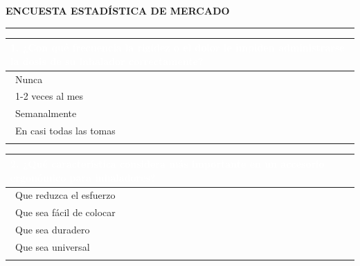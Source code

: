 \documentclass[11pt,a4paper]{article}
\begin{document}
\newcommand{\casilla}{\raisebox{-0.5ex}{\fbox{\rule{0pt}{3mm}\rule{3mm}{0pt}}}}


\begin{center}
    \Large\textbf{\color{ArthroNavy}ENCUESTA ESTADÍSTICA DE MERCADO} \\
    \vspace{0.2cm}
    \rule{\linewidth}{1.5pt}
\end{center}
\vspace{0.4cm}

\noindent
\begin{tabularx}{\linewidth}{|X|}
\hline
\rowcolor{ArthroTeal}
\textcolor{white}{\textbf{1. ¿Con qué frecuencia la rigidez o el dolor le impiden administrarse la dosis de su inhalador correctamente?}} \\ \hline
\vspace{0.1cm}
\hspace{0.4cm} \casilla \ Nunca \\[0.15cm]
\hspace{0.4cm} \casilla \ 1-2 veces al mes \\[0.15cm]
\hspace{0.4cm} \casilla \ Semanalmente \\[0.15cm]
\hspace{0.4cm} \casilla \ En casi todas las tomas \\
\vspace{0.1cm} \\ 
\hline
\end{tabularx}

\vspace{0.5cm}

\noindent
\begin{tabularx}{\linewidth}{|X|}
\hline
\rowcolor{ArthroTeal}
\textcolor{white}{\textbf{2. ¿Qué característica considera más importante en un accesorio ergonómico para inhaladores?}} \\ \hline
\vspace{0.1cm}
\hspace{0.4cm} \casilla \ Que reduzca el esfuerzo \\[0.15cm]
\hspace{0.4cm} \casilla \ Que sea fácil de colocar \\[0.15cm]
\hspace{0.4cm} \casilla \ Que sea duradero \\[0.15cm]
\hspace{0.4cm} \casilla \ Que sea universal \\
\vspace{0.1cm} \\ 
\hline
\end{tabularx}
\end{document}
